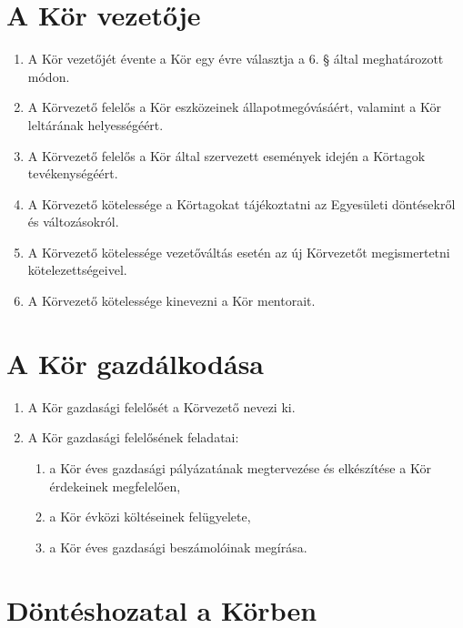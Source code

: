 \documentclass[12pt]{article}
\begin{document}

\section{A Kör vezetője}

\begin{enumerate}
  \item A Kör vezetőjét évente a Kör egy évre választja a 6. § által meghatározott módon.
  \item A Körvezető felelős a Kör eszközeinek állapotmegóvásáért, valamint a Kör leltárának helyességéért.
  \item A Körvezető felelős a Kör által szervezett események idején a Körtagok tevékenységéért.
  \item A Körvezető kötelessége a Körtagokat tájékoztatni az Egyesületi döntésekről és változásokról.
  \item A Körvezető kötelessége vezetőváltás esetén az új Körvezetőt megismertetni kötelezettségeivel.
  \item A Körvezető kötelessége kinevezni a Kör mentorait.
\end{enumerate}


\section{A Kör gazdálkodása}

\begin{enumerate}
  \item A Kör gazdasági felelősét a Körvezető nevezi ki.
  \item A Kör gazdasági felelősének feladatai:
  \begin{enumerate}
    \item a Kör éves gazdasági pályázatának megtervezése és elkészítése a Kör érdekeinek megfelelően,
    \item a Kör évközi költéseinek felügyelete,
    \item a Kör éves gazdasági beszámolóinak megírása.
  \end{enumerate}
\end{enumerate}


\section{Döntéshozatal a Körben}
\end{document}
